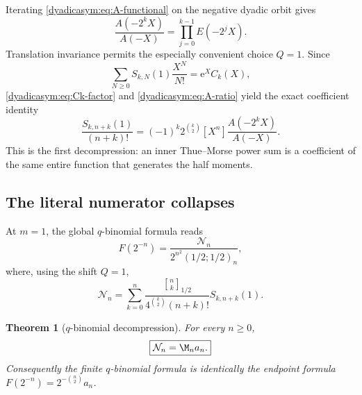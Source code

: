 \documentclass[11pt,oneside]{article}
\newtheorem{theorem}{Theorem}[section]
\theoremstyle{definition}
\theoremstyle{remark}
\newcommand{\e}{\mathrm e}
\newcommand{\qbinom}[3]{\genfrac{[}{]}{0pt}{}{#1}{#2}_{#3}}
\begin{document}
Iterating \eqref{dyadicasym:eq:A-functional} on the negative dyadic orbit gives
\begin{equation}
 \frac{A(-2^kX)}{A(-X)}=\prod_{j=0}^{k-1}E(-2^jX).          \label{dyadicasym:eq:A-ratio}
\end{equation}
Translation invariance permits the especially convenient choice $Q=1$.  Since
\begin{equation}
 \sum_{N\ge0}S_{k,N}(1)\frac{X^N}{N!}=\e^XC_k(X),          \label{dyadicasym:eq:S-egf}
\end{equation}
\eqref{dyadicasym:eq:Ck-factor} and \eqref{dyadicasym:eq:A-ratio} yield the exact coefficient identity
\begin{equation}
 \boxed{
 \frac{S_{k,n+k}(1)}{(n+k)!}
 =(-1)^k2^{\binom k2}
 [X^n]\frac{A(-2^kX)}{A(-X)}.}                             \label{dyadicasym:eq:S-ratio-coeff}
\end{equation}
This is the first decompression: an inner Thue--Morse power sum is a coefficient of the same
entire function that generates the half moments.

\subsection{The literal numerator collapses}

At $m=1$, the global $q$-binomial formula reads
\begin{equation}
 F(2^{-n})=\frac{\mathcal N_n}
 {2^{n^2}(1/2;1/2)_n},                                     \label{dyadicasym:eq:q-F-N}
\end{equation}
where, using the shift $Q=1$,
\begin{equation}
 \mathcal N_n=
 \sum_{k=0}^n
 \frac{\qbinom nk{1/2}}{4^{\binom k2}(n+k)!}
 S_{k,n+k}(1).                                              \label{dyadicasym:eq:q-numerator}
\end{equation}

\begin{theorem}[$q$-binomial decompression]
\label{dyadicasym:thm:q-decompression}
For every $n\ge0$,
\begin{equation}
 \boxed{\mathcal N_n=\M_na_n.}                             \label{dyadicasym:eq:N-m-a}
\end{equation}
Consequently the finite $q$-binomial formula is identically the endpoint formula
$F(2^{-n})=2^{-\binom n2}a_n$.
\end{theorem}
\end{document}
